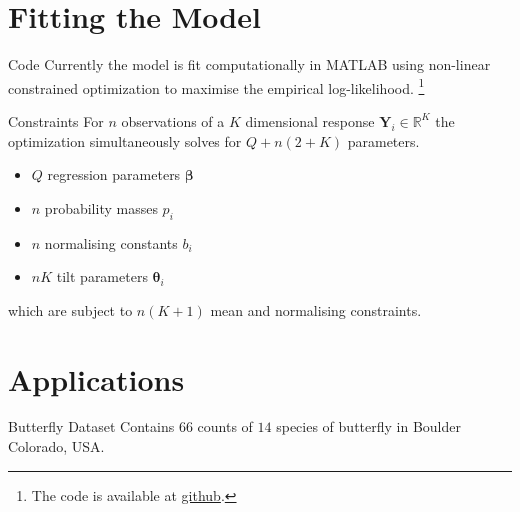 \documentclass[9pt,notes=hide]{beamer}
\newcommand{\vect}[1]{\boldsymbol #1}
\newcommand{\R}{\mathbb R}
\newcommand{\vbe}{\vect{\beta}}
\newcommand{\Y}{\vect{Y}}
\begin{document}
\section{Fitting the Model}
\begin{frame}{Code}
	Currently the model is fit computationally in MATLAB using
	non-linear constrained  optimization to maximise the empirical log-likelihood.
	\footnote{The code is available at \href{https://github.com/gden173/vspglm}{github}.}
\end{frame}


\begin{frame}{Constraints}
	For $n$ observations of a $K$ dimensional response $\Y_i \in \R^K$ the optimization simultaneously solves for
	$Q + n(2 + K)$ parameters. \pause
	\begin{itemize}[<+->]
		\item  $Q$ regression parameters $\vbe$
		\item $n$ probability masses $p_i$
		\item  $n$ normalising constants $b_i$
		\item  $nK$ tilt parameters $\vect{\theta}_i$
	\end{itemize}
	\pause[\thebeamerpauses]
	which are subject to $n(K + 1)$ mean and normalising constraints.
\end{frame}



\section{Applications}

\begin{frame}{Butterfly Dataset}
	Contains $66$  counts of  $14$ species of butterfly in
	Boulder Colorado, USA. \\
	\begin{table}
		\centering
		\caption{Snippet of Butterfly Counts for the $3$ most common species}
	\end{table}
\end{frame}
\end{document}
